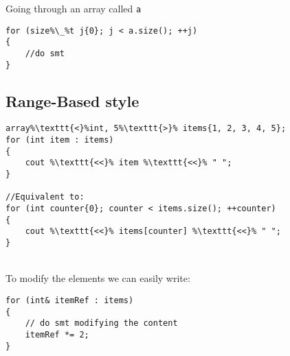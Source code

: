 \noindent Going through an array called \texttt{a}\\
\begin{minipage}{.5\textwidth}
\end{minipage}\hspace{0.72cm}
\begin{minipage}{.6\textwidth}
\vspace{0.1cm}
\begin{lstlisting}[frame=tlrb,numbers=none,mathescape=true,escapechar=\%,columns=flexible]
for (size%\_%t j{0}; j < a.size(); ++j)
{
    //do smt
}
\end{lstlisting}
\end{minipage}

\subsection{Range-Based style}

\begin{minipage}{.5\textwidth}
\end{minipage}\hspace{0.72cm}
\begin{minipage}{.6\textwidth}
\vspace{0.1cm}
\begin{lstlisting}[frame=tlrb,numbers=none,mathescape=true,escapechar=\%,columns=flexible]
array%\texttt{<}%int, 5%\texttt{>}% items{1, 2, 3, 4, 5};
for (int item : items)
{
    cout %\texttt{<<}% item %\texttt{<<}% " ";
}

//Equivalent to:
for (int counter{0}; counter < items.size(); ++counter) 
{
    cout %\texttt{<<}% items[counter] %\texttt{<<}% " ";
}
\end{lstlisting}
\end{minipage}
\\
\noindent To modify the elements we can easily write:\\
\begin{minipage}{.5\textwidth}
\end{minipage}\hspace{0.72cm}
\begin{minipage}{.6\textwidth}
\vspace{0.1cm}
\begin{lstlisting}[frame=tlrb,numbers=none,mathescape=true,escapechar=\%,columns=flexible]
for (int& itemRef : items)
{
    // do smt modifying the content
    itemRef *= 2;
}
\end{lstlisting}
\end{minipage}


